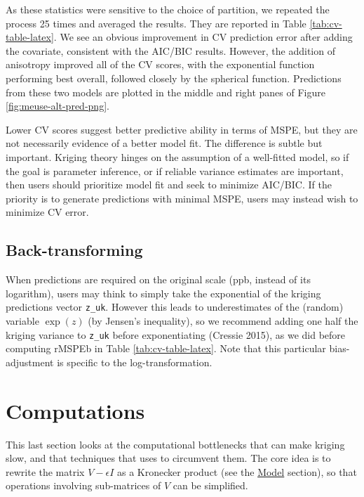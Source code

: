 As these statistics were sensitive to the choice of partition, we repeated the process 25 times and averaged the results. They are reported in Table
\ref{tab:cv-table-latex}.
We see an obvious improvement in CV prediction error after adding the covariate, consistent with the AIC/BIC results. However, the addition of anisotropy improved all of the CV scores, with the exponential function performing best overall, followed closely by the spherical function. Predictions from these two models are plotted in the middle and right panes of Figure \ref{fig:meuse-alt-pred-png}.

Lower CV scores suggest better predictive ability in terms of MSPE, but they are not necessarily evidence of a better model fit. The difference is subtle but important. Kriging theory hinges on the assumption of a well-fitted model, so if the goal is parameter inference, or if reliable variance estimates are important, then users should prioritize model fit and seek to minimize AIC/BIC. If the priority is to generate predictions with minimal MSPE, users may instead wish to minimize CV error.

\hypertarget{back-transforming}{%
\subsection{Back-transforming}\label{back-transforming}}

When predictions are required on the original scale (ppb, instead of its logarithm), users may think to simply take the exponential of the kriging predictions vector \texttt{z\_uk}. However this leads to underestimates of the (random) variable \(\exp(z)\) (by Jensen's inequality), so we recommend adding one half the kriging variance to \texttt{z\_uk} before exponentiating (Cressie 2015), as we did before computing rMSPEb in Table \ref{tab:cv-table-latex}. Note that this particular bias-adjustment is specific to the log-transformation.

\hypertarget{computations}{%
\section{Computations}\label{computations}}

This last section looks at the computational bottlenecks that can make kriging slow, and that techniques that  uses to circumvent them. The core idea is to rewrite the matrix \(V - \epsilon I\) as a Kronecker product (see the \protect\hyperlink{model}{Model} section), so that operations involving sub-matrices of \(V\) can be simplified.

